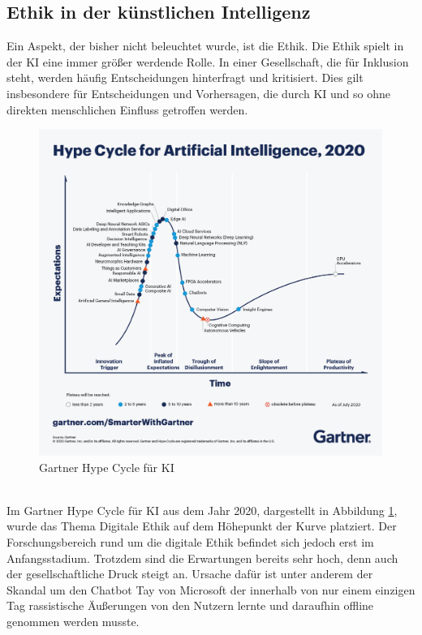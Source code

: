 \begin{onehalfspace}
    \subsection{Ethik in der künstlichen Intelligenz}
    \label{subsubsec:ethikinderKI}
    Ein Aspekt, der bisher nicht beleuchtet wurde, ist die Ethik. Die Ethik spielt in der \ac{KI} eine immer größer werdende Rolle. In einer Gesellschaft, die für Inklusion steht, werden häufig Entscheidungen hinterfragt und kritisiert. Dies gilt insbesondere für Entscheidungen und Vorhersagen, die durch \ac{KI} und so ohne direkten menschlichen Einfluss getroffen werden.
        \begin{figure}[h]
            \centering
            \includegraphics[width = 14cm]{Bilder/Gartner_hypeCycle.png}
            \caption{Gartner Hype Cycle für \ac*{KI} \cite{Goasduff2020}}
            \label{fig:HypeCycle}
        \end{figure}
        \\
        Im Gartner Hype Cycle für \ac*{KI} aus dem Jahr 2020, dargestellt in Abbildung \ref*{fig:HypeCycle}, wurde das Thema Digitale Ethik auf dem Höhepunkt der Kurve platziert. Der Forschungsbereich rund um die digitale Ethik befindet sich jedoch erst im Anfangsstadium. Trotzdem sind die Erwartungen bereits sehr hoch, denn auch der gesellschaftliche Druck steigt an. Ursache dafür ist unter anderem der Skandal um den Chatbot Tay von Microsoft der innerhalb von nur einem einzigen Tag rassistische \"Außerungen von den Nutzern lernte und daraufhin offline genommen werden musste.\cite{Cremers2019}

\end{onehalfspace}
